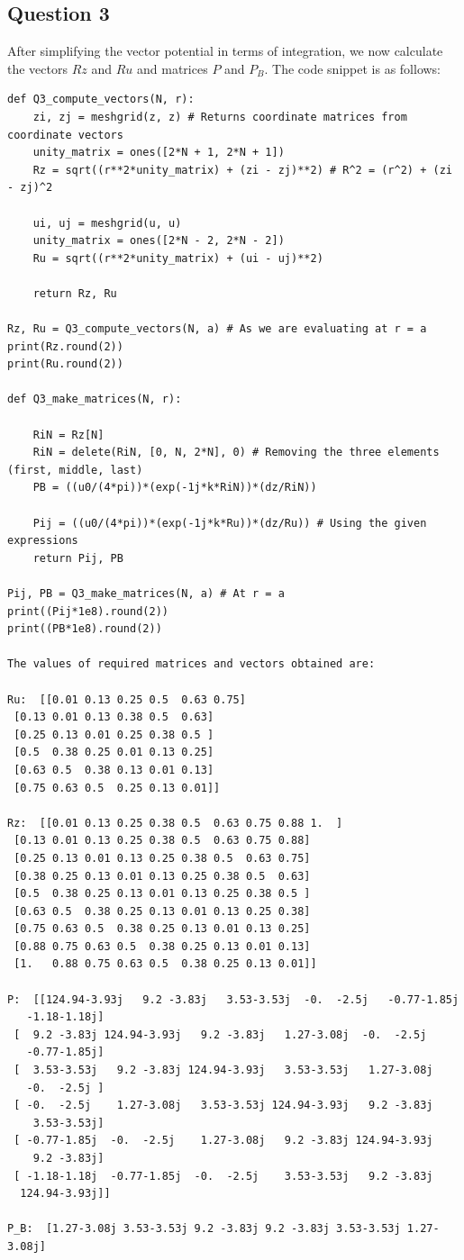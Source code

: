 \documentclass{article}
\begin{document}
\subsection{Question 3}
After simplifying the vector potential in terms of integration, we now calculate the vectors $Rz$ and $Ru$ and matrices $P$ and $P_{B}$.
The code snippet is as follows:

\begin{verbatim}
def Q3_compute_vectors(N, r):
    zi, zj = meshgrid(z, z) # Returns coordinate matrices from coordinate vectors
    unity_matrix = ones([2*N + 1, 2*N + 1]) 
    Rz = sqrt((r**2*unity_matrix) + (zi - zj)**2) # R^2 = (r^2) + (zi - zj)^2 

    ui, uj = meshgrid(u, u)
    unity_matrix = ones([2*N - 2, 2*N - 2])
    Ru = sqrt((r**2*unity_matrix) + (ui - uj)**2) 

    return Rz, Ru

Rz, Ru = Q3_compute_vectors(N, a) # As we are evaluating at r = a
print(Rz.round(2))
print(Ru.round(2))

def Q3_make_matrices(N, r):
    
    RiN = Rz[N] 
    RiN = delete(RiN, [0, N, 2*N], 0) # Removing the three elements (first, middle, last) 
    PB = ((u0/(4*pi))*(exp(-1j*k*RiN))*(dz/RiN))
    
    Pij = ((u0/(4*pi))*(exp(-1j*k*Ru))*(dz/Ru)) # Using the given expressions
    return Pij, PB

Pij, PB = Q3_make_matrices(N, a) # At r = a   
print((Pij*1e8).round(2))
print((PB*1e8).round(2))

The values of required matrices and vectors obtained are: 

Ru:  [[0.01 0.13 0.25 0.5  0.63 0.75]
 [0.13 0.01 0.13 0.38 0.5  0.63]
 [0.25 0.13 0.01 0.25 0.38 0.5 ]
 [0.5  0.38 0.25 0.01 0.13 0.25]
 [0.63 0.5  0.38 0.13 0.01 0.13]
 [0.75 0.63 0.5  0.25 0.13 0.01]]

Rz:  [[0.01 0.13 0.25 0.38 0.5  0.63 0.75 0.88 1.  ]
 [0.13 0.01 0.13 0.25 0.38 0.5  0.63 0.75 0.88]
 [0.25 0.13 0.01 0.13 0.25 0.38 0.5  0.63 0.75]
 [0.38 0.25 0.13 0.01 0.13 0.25 0.38 0.5  0.63]
 [0.5  0.38 0.25 0.13 0.01 0.13 0.25 0.38 0.5 ]
 [0.63 0.5  0.38 0.25 0.13 0.01 0.13 0.25 0.38]
 [0.75 0.63 0.5  0.38 0.25 0.13 0.01 0.13 0.25]
 [0.88 0.75 0.63 0.5  0.38 0.25 0.13 0.01 0.13]
 [1.   0.88 0.75 0.63 0.5  0.38 0.25 0.13 0.01]]

P:  [[124.94-3.93j   9.2 -3.83j   3.53-3.53j  -0.  -2.5j   -0.77-1.85j
   -1.18-1.18j]
 [  9.2 -3.83j 124.94-3.93j   9.2 -3.83j   1.27-3.08j  -0.  -2.5j
   -0.77-1.85j]
 [  3.53-3.53j   9.2 -3.83j 124.94-3.93j   3.53-3.53j   1.27-3.08j
   -0.  -2.5j ]
 [ -0.  -2.5j    1.27-3.08j   3.53-3.53j 124.94-3.93j   9.2 -3.83j
    3.53-3.53j]
 [ -0.77-1.85j  -0.  -2.5j    1.27-3.08j   9.2 -3.83j 124.94-3.93j
    9.2 -3.83j]
 [ -1.18-1.18j  -0.77-1.85j  -0.  -2.5j    3.53-3.53j   9.2 -3.83j
  124.94-3.93j]]

P_B:  [1.27-3.08j 3.53-3.53j 9.2 -3.83j 9.2 -3.83j 3.53-3.53j 1.27-3.08j]
\end{verbatim}
\end{document}
